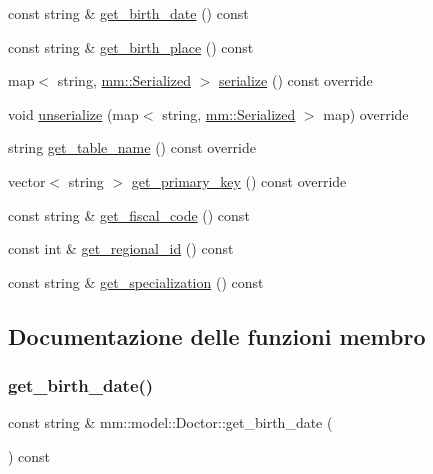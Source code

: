 \begin{DoxyCompactItemize}
\item 
const string \& \hyperlink{classmm_1_1model_1_1_doctor_afa648dfa2f37c1de94a742bd58682899}{get\+\_\+birth\+\_\+date} () const
\item 
const string \& \hyperlink{classmm_1_1model_1_1_doctor_a14283e664d8689ad296e46969c129cad}{get\+\_\+birth\+\_\+place} () const
\item 
map$<$ string, \hyperlink{structmm_1_1_serialized}{mm\+::\+Serialized} $>$ \hyperlink{classmm_1_1model_1_1_doctor_a2171a9cb9c8a24ad0c0331edae957910}{serialize} () const override
\item 
void \hyperlink{classmm_1_1model_1_1_doctor_a20bedf6695024e1930d033995a2ec5bf}{unserialize} (map$<$ string, \hyperlink{structmm_1_1_serialized}{mm\+::\+Serialized} $>$ map) override
\item 
string \hyperlink{classmm_1_1model_1_1_doctor_af4c37e48f9e5ff26f2295678f10afaa3}{get\+\_\+table\+\_\+name} () const override
\item 
vector$<$ string $>$ \hyperlink{classmm_1_1model_1_1_doctor_a935989cbe2274076c2b409126d4faccd}{get\+\_\+primary\+\_\+key} () const override
\item 
const string \& \hyperlink{classmm_1_1model_1_1_doctor_ad49c6f0fdc31a96edaeada72ba88ceec}{get\+\_\+fiscal\+\_\+code} () const
\item 
const int \& \hyperlink{classmm_1_1model_1_1_doctor_a26810a7e1e0682d2dbb7c92ac3a8247b}{get\+\_\+regional\+\_\+id} () const
\item 
const string \& \hyperlink{classmm_1_1model_1_1_doctor_ab5b807b5ce91d9f20603f091e62fe17a}{get\+\_\+specialization} () const
\end{DoxyCompactItemize}


\subsection{Documentazione delle funzioni membro}
\mbox{\label{classmm_1_1model_1_1_doctor_afa648dfa2f37c1de94a742bd58682899}} 
\subsubsection{\texorpdfstring{get\+\_\+birth\+\_\+date()}{get\_birth\_date()}}
{\footnotesize\ttfamily const string \& mm\+::model\+::\+Doctor\+::get\+\_\+birth\+\_\+date (\begin{DoxyParamCaption}{ }\end{DoxyParamCaption}) const}

